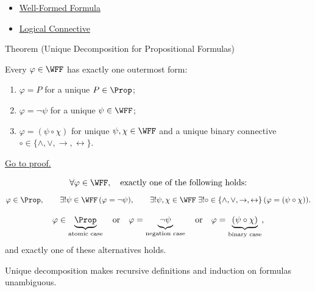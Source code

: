 \begin{dependencies}
\begin{itemize}
  \item \hyperref[def:well-formed-formula]{Well-Formed Formula}
  \item \hyperref[def:logical-connective]{Logical Connective}
\end{itemize}
\end{dependencies}
\begin{theorembox}{Theorem (Unique Decomposition for Propositional Formulas)}
\begin{theorem}
\label{thm:unique-decomposition-propositional-formulas}
Every \(\varphi\in\WFF\) has exactly one outermost form:
\begin{enumerate}
\item \(\varphi=P\) for a unique \(P\in\Prop\);
\item \(\varphi=\neg\psi\) for a unique \(\psi\in\WFF\);
\item \(\varphi=(\psi\circ\chi)\) for unique \(\psi,\chi\in\WFF\) and a unique binary connective \(\circ\in\{\land,\lor,\to,\leftrightarrow\}\).
\end{enumerate}

\noindent\hyperref[prf:unique-decomposition-propositional-formulas]{Go to proof.}
\end{theorem}
\end{theorembox}

\begin{remark*}
\[
\forall\varphi\in\WFF,\quad
\text{exactly one of the following holds:}
\]
\[
\varphi\in\Prop,\qquad
\exists!\psi\in\WFF\,(\varphi=\neg\psi),\qquad
\exists!\psi,\chi\in\WFF\;\exists!\circ\in\{\land,\lor,\to,\leftrightarrow\}\,(\varphi=(\psi\circ\chi)).
\]
\end{remark*}

\begin{remark*}
\[
\varphi
\in
\underbrace{\Prop}_{\text{atomic case}}
\quad\text{or}\quad
\varphi=
\underbrace{\neg\psi}_{\text{negation case}}
\quad\text{or}\quad
\varphi=
\underbrace{(\psi\circ\chi)}_{\text{binary case}},
\]
and exactly one of these alternatives holds.
\end{remark*}

\begin{remark*}[Interpretation]
Unique decomposition makes recursive definitions and induction on formulas unambiguous.
\end{remark*}

